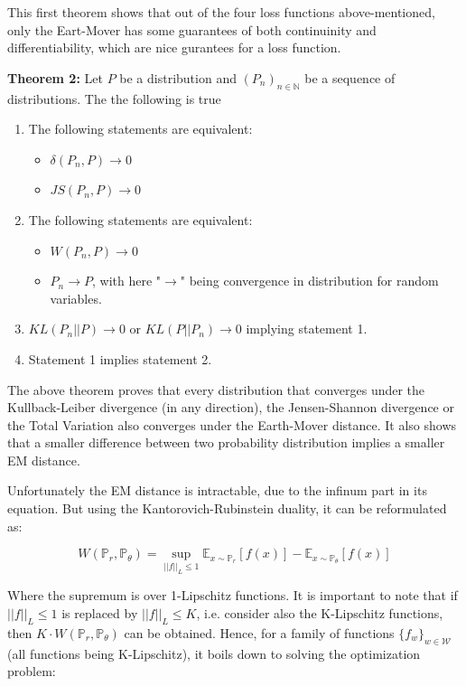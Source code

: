 \documentclass[11pt,a4paper,twoside]{report}
\begin{document}
This first theorem shows that out of the four loss functions above-mentioned, only the Eart-Mover has some guarantees of both continuinity and differentiability, which are nice gurantees for a loss function.

\textbf{Theorem 2:} Let $P$ be a distribution and $(P_n)_{n \in \mathbb{N}}$ be a sequence of distributions. The the following is true

\begin{enumerate}
    \item The following statements are equivalent:
    \begin{itemize}
        \item $\delta(P_n, P) \rightarrow 0$
        \item $JS(P_n, P) \rightarrow 0$
    \end{itemize}
    \item The following statements are equivalent:
    \begin{itemize}
        \item $W(P_n, P) \rightarrow 0$
        \item $P_n \rightarrow P$, with here "$\rightarrow$" being convergence in distribution for random variables. 
    \end{itemize}
    \item $KL(P_n||P) \rightarrow 0$ or $KL(P||P_n) \rightarrow 0$ implying statement 1.
    \item Statement 1 implies statement 2.
\end{enumerate}

The above theorem proves that every distribution that converges under the Kullback-Leiber divergence (in any direction), the Jensen-Shannon divergence or the Total Variation also converges under the Earth-Mover distance. It also shows that a smaller difference between two probability distribution implies a smaller EM distance. 

Unfortunately the EM distance is intractable, due to the infinum part in its equation. But using the Kantorovich-Rubinstein duality, it can be reformulated as:



\begin{equation}
    W(\mathbb{P}_r, \mathbb{P}_{\theta}) = \sup_{||f||_L \leq 1} \mathbb{E}_{x \sim \mathbb{P}_r} [f(x)] - \mathbb{E}_{x \sim \mathbb{P}_{\theta}} [f(x)] 
\end{equation}

Where the supremum is over 1-Lipschitz functions. It is important to note that if $||f||_L \leq 1$  is replaced by $||f||_L \leq K$, i.e. consider also the K-Lipschitz functions, then $K \cdot W(\mathbb{P}_r, \mathbb{P}_{\theta})$ can be obtained. Hence, for a family of functions $\{f_w\}_{w \in \mathcal{W}}$ (all functions being K-Lipschitz), it boils down to solving the optimization problem:
\end{document}
